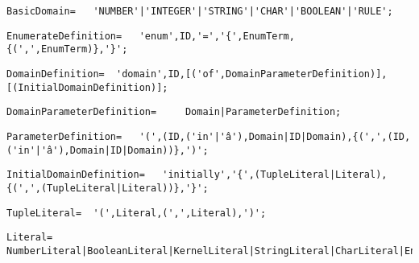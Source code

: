 \documentclass{article}
\begin{document}
    \begin{flushleft}
    \begin{lstlisting}[mathescape=true, breaklines=true]
     BasicDomain= 	'NUMBER'|'INTEGER'|'STRING'|'CHAR'|'BOOLEAN'|'RULE';
    \end{lstlisting}
    \end{flushleft}
    \begin{flushleft}
    \begin{lstlisting}[mathescape=true, breaklines=true]
     EnumerateDefinition= 	'enum',ID,'=','{',EnumTerm,{(',',EnumTerm)},'}';
    \end{lstlisting}
    \end{flushleft}
    \begin{flushleft}
    \begin{lstlisting}[mathescape=true, breaklines=true]
     DomainDefinition= 	'domain',ID,[('of',DomainParameterDefinition)],[(InitialDomainDefinition)];
    \end{lstlisting}
    \end{flushleft}
    \begin{flushleft}
    \begin{lstlisting}[mathescape=true, breaklines=true]
     DomainParameterDefinition= 	Domain|ParameterDefinition;
    \end{lstlisting}
    \end{flushleft}
    \begin{flushleft}
    \begin{lstlisting}[mathescape=true, breaklines=true]
     ParameterDefinition= 	'(',(ID,('in'|'â'),Domain|ID|Domain),{(',',(ID,('in'|'â'),Domain|ID|Domain))},')';
    \end{lstlisting}
    \end{flushleft}
    \begin{flushleft}
    \begin{lstlisting}[mathescape=true, breaklines=true]
     InitialDomainDefinition= 	'initially','{',(TupleLiteral|Literal),{(',',(TupleLiteral|Literal))},'}';
    \end{lstlisting}
    \end{flushleft}
    \begin{flushleft}
    \begin{lstlisting}[mathescape=true, breaklines=true]
     TupleLiteral= 	'(',Literal,(',',Literal),')';
    \end{lstlisting}
    \end{flushleft}
    \begin{flushleft}
    \begin{lstlisting}[mathescape=true, breaklines=true]
     Literal= 	NumberLiteral|BooleanLiteral|KernelLiteral|StringLiteral|CharLiteral|EnumTerm;
    \end{lstlisting}
    \end{flushleft}
\end{document}
